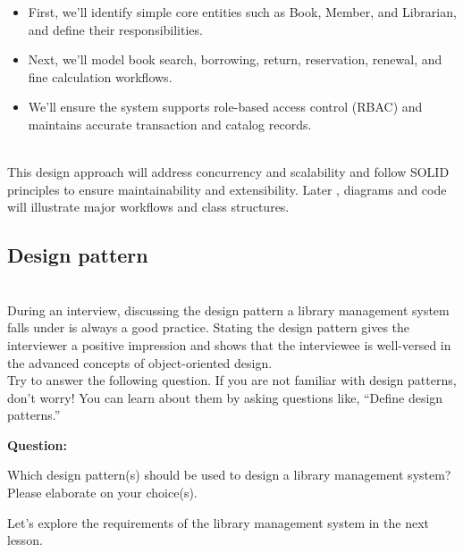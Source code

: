 \begin{itemize}
\item
First, we'll identify simple core entities such as Book, Member, and Librarian, and define their responsibilities.
\item
Next, we'll model book search, borrowing, return, reservation, renewal, and fine calculation workflows.
\item
We'll ensure the system supports role-based access control (RBAC) and maintains accurate transaction and catalog records.
\end{itemize}
\\
This design approach will address concurrency and scalability and follow SOLID principles to ensure maintainability and extensibility. Later , diagrams and code will illustrate major workflows and class structures.

\subsection{Design pattern~}\label{62LNh9ika4Xt1fqohoXRs}
\\
During an interview, discussing the design pattern a library management system falls under is always a good practice. Stating the design pattern gives the interviewer a positive impression and shows that the interviewee is well-versed in the advanced concepts of object-oriented design.
\\
Try to answer the following question. If you are not familiar with design patterns, don't worry! You can learn about them by asking questions like, ``Define design patterns.''

\textbf{Question:}

Which design pattern(s) should be used to design a library management system? Please elaborate on your choice(s).

Let's explore the requirements of the library management system in the next lesson.

